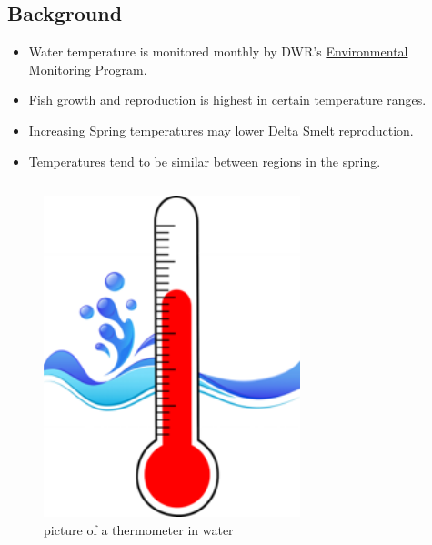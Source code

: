 \documentclass[
]{book}
\providecommand{\tightlist}{%
  \setlength{\itemsep}{0pt}\setlength{\parskip}{0pt}}
\begin{document}
\begin{columns-nocenter}

\begin{column}

\hypertarget{background-1}{%
\subsection{Background}\label{background-1}}

\begin{itemize}
\tightlist
\item
  Water temperature is monitored monthly by DWR's \href{https://emp.baydeltalive.com/wiki/12297}{Environmental Monitoring Program}.
\item
  Fish growth and reproduction is highest in certain temperature ranges.
\item
  Increasing Spring temperatures may lower Delta Smelt reproduction.
\item
  Temperatures tend to be similar between regions in the spring.
\end{itemize}

\end{column}

\begin{column}

\begin{figure}

{\centering \includegraphics[width=2.94in]{figures/thermometer} 

}

\caption{picture of a thermometer in water}\label{fig:unnamed-chunk-12}
\end{figure}

\end{column}

\end{columns-nocenter}
\end{document}
